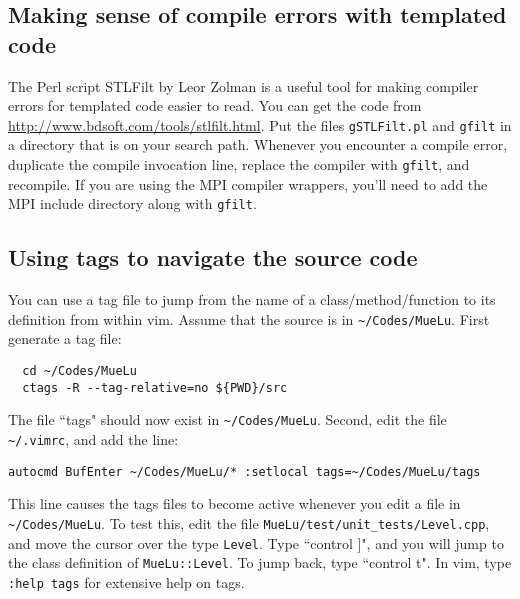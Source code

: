 \subsection{Making sense of compile errors with templated code}
The Perl script STLFilt by Leor Zolman is a useful tool for making compiler errors for templated code easier to read.  You
can get the code from \url{http://www.bdsoft.com/tools/stlfilt.html}.
Put the files \verb!gSTLFilt.pl! and \verb!gfilt! in a directory that is on your search path.
Whenever you encounter a compile error, duplicate the compile invocation line, replace the compiler with \verb!gfilt!, and recompile.
If you are using the MPI compiler wrappers, you'll need to add the MPI include directory along with
\verb!gfilt!.

\subsection{Using tags to navigate the \muelu source code}
You can use a tag file to jump from the name of a class/method/function
to its definition from within vim.   Assume that the \muelu source is in \verb!~/Codes/MueLu!.  First generate a tag file:
\begin{verbatim}
  cd ~/Codes/MueLu
  ctags -R --tag-relative=no ${PWD}/src
\end{verbatim}
The file ``tags" should now exist in \verb!~/Codes/MueLu!.  Second, edit the file \verb!~/.vimrc!, and add the
line:
\begin{verbatim}
autocmd BufEnter ~/Codes/MueLu/* :setlocal tags=~/Codes/MueLu/tags
\end{verbatim}
This line causes the tags files to become active whenever you edit a file in \verb!~/Codes/MueLu!.  To test this, edit
the file \verb!MueLu/test/unit_tests/Level.cpp!, and move the cursor over the type \verb!Level!.  Type ``control ]",
and you will jump to the class definition of \verb!MueLu::Level!.  To jump back, type ``control t".
In vim, type \verb!:help tags! for extensive help on tags.
